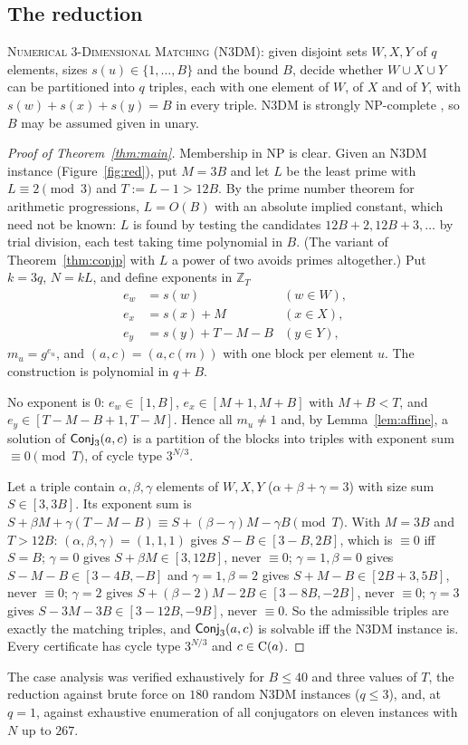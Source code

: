 \documentclass[preprint,12pt]{elsarticle}
\theoremstyle{definition}\newtheorem{defi}[thm]{Definition}\newtheorem{prob}[thm]{Problem}\newtheorem{obs}[thm]{Observation}
\theoremstyle{remark}\newtheorem{rem}[thm]{Remark}
\newcommand{\ZZ}{\mathbb Z}\newcommand{\Sym}{\operatorname{Sym}}\newcommand{\Alt}{\operatorname{Alt}}
\begin{document}
\subsection{The reduction}

\textsc{Numerical 3-Dimensional Matching} (N3DM): given disjoint sets $W,X,Y$ of $q$ elements, sizes $s(u)\in\{1,\ldots,B\}$ and the bound $B$, decide whether $W\cup X\cup Y$ can be partitioned into $q$ triples, each with one element of $W$, of $X$ and of $Y$, with $s(w)+s(x)+s(y)=B$ in every triple. N3DM is strongly NP-complete \cite[SP16]{garey1979}, so $B$ may be assumed given in unary.

\begin{proof}[Proof of Theorem~\ref{thm:main}]
Membership in NP is clear. Given an N3DM instance (Figure~\ref{fig:red}), put $M=3B$ and let $L$ be the least prime with $L\equiv2\pmod3$ and $T:=L-1>12B$. By the prime number theorem
for arithmetic progressions, $L=O(B)$ with an absolute implied constant, which need not be known: $L$ is found by testing the candidates
$12B+2,12B+3,\dots$ by trial division, each test taking time polynomial in $B$. (The variant of Theorem~\ref{thm:conjp} with $L$ a power
of two avoids primes altogether.) Put $k=3q$, $N=kL$, and define exponents in $\ZZ_T$
\begin{align*}
 e_w&=s(w) &(w\in W),\\
 e_x&=s(x)+M &(x\in X),\\
 e_y&=s(y)+T-M-B &(y\in Y),
\end{align*}
$m_u=g^{e_u}$, and $(a,c)=(a,c(m))$ with one block per element $u$. The construction is polynomial in $q+B$.

No exponent is $0$: $e_w\in[1,B]$, $e_x\in[M+1,M+B]$ with $M+B<T$, and $e_y\in[T-M-B+1,T-M]$. Hence all $m_u\neq1$ and, by Lemma~\ref{lem:affine}, a solution of $\mathsf{Conj}_{3}(a,c)$ is a partition of the blocks into triples with exponent sum $\equiv0\pmod T$, of cycle type $3^{N/3}$.

Let a triple contain $\alpha,\beta,\gamma$ elements of $W,X,Y$ ($\alpha+\beta+\gamma=3$) with size sum $S\in[3,3B]$. Its exponent sum is $S+\beta M+\gamma(T-M-B)\equiv S+(\beta-\gamma)M-\gamma B\pmod T$. With $M=3B$ and $T>12B$:
$(\alpha,\beta,\gamma)=(1,1,1)$ gives $S-B\in[3-B,2B]$, which is $\equiv0$ iff $S=B$;
$\gamma=0$ gives $S+\beta M\in[3,12B]$, never $\equiv0$;
$\gamma=1,\beta=0$ gives $S-M-B\in[3-4B,-B]$ and $\gamma=1,\beta=2$ gives $S+M-B\in[2B+3,5B]$, never $\equiv0$;
$\gamma=2$ gives $S+(\beta-2)M-2B\in[3-8B,-2B]$, never $\equiv0$;
$\gamma=3$ gives $S-3M-3B\in[3-12B,-9B]$, never $\equiv0$.
So the admissible triples are exactly the matching triples, and $\mathsf{Conj}_{3}(a,c)$ is solvable iff the N3DM instance is. Every certificate has cycle type $3^{N/3}$ and $c\in\operatorname{C}(a)$.
\end{proof}
The case analysis was verified exhaustively for $B\le40$ and three values of $T$, the reduction against brute force on $180$ random N3DM instances ($q\le3$), and, at $q=1$, against exhaustive enumeration of all conjugators on eleven instances with $N$ up to $267$.
\end{document}
